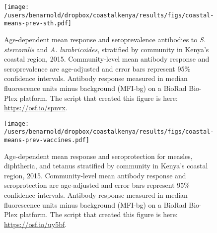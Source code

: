 \documentclass[11pt]{article}
\begin{document}
\begin{landscape}
\begin{figure}[htbp]
\begin{center}
\texttt{[image: /users/benarnold/dropbox/coastalkenya/results/figs/coastal-means-prev-sth.pdf]} 
\begin{minipage}{1.2\textwidth}
\caption{Age-dependent mean response and seroprevalence antibodies to \emph{S. stercoralis} and \emph{A. lumbricoides}, stratified by community in Kenya's coastal region, 2015. Community-level mean antibody response and seroprevalence are age-adjusted and error bars represent 95\% confidence intervals. Antibody response measured in median fluorescence units minus background (MFI-bg) on a BioRad Bio-Plex platform. The script that created this figure is here: \url{https://osf.io/spnvx}.  \label{fig:STHbigfig}}
\end{minipage}
\end{center}
\end{figure}
\end{landscape}


\begin{landscape}
\begin{figure}[htbp]
\begin{center}
\texttt{[image: /users/benarnold/dropbox/coastalkenya/results/figs/coastal-means-prev-vaccines.pdf]} 
\begin{minipage}{1.2\textwidth}
\caption{Age-dependent mean response and seroprotection for measles, diphtheria, and tetanus stratified by community in Kenya's coastal region, 2015. Community-level mean antibody response and seroprotection are age-adjusted and error bars represent 95\% confidence intervals. Antibody response measured in median fluorescence units minus background (MFI-bg) on a BioRad Bio-Plex platform.  The script that created this figure is here: \url{https://osf.io/uy5bf}.  \label{fig:vaccinebigpfig}}
\end{minipage}
\end{center}
\end{figure}
\end{landscape}
\end{document}
